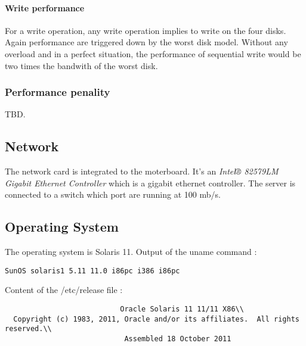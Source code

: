 \paragraph{Write performance}
For a write operation, any write operation implies to write on the four disks.
Again performance are triggered down by the worst disk model.
Without any overload and in a perfect situation, the performance of sequential
write would be two times the bandwith of the worst disk.

\subsubsection{Performance penality}
TBD.

\subsection{Network}
The network card is integrated to the moterboard. It's an \emph{Intel® 82579LM Gigabit
Ethernet Controller} which is a gigabit ethernet controller.
The server is connected to a switch which port are running at 100 mb/s.

\subsection{Operating System}
The operating system is Solaris 11.
Output of the uname command :
\begin{verbatim}
SunOS solaris1 5.11 11.0 i86pc i386 i86pc
\end{verbatim}
Content of the /etc/release file :
\begin{verbatim}
                           Oracle Solaris 11 11/11 X86\\
  Copyright (c) 1983, 2011, Oracle and/or its affiliates.  All rights reserved.\\
                            Assembled 18 October 2011
\end{verbatim}

